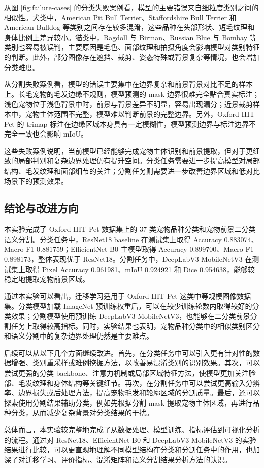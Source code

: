 \documentclass[UTF8,a4paper,12pt]{ctexart}
\begin{document}
从图 \ref{fig:failure-cases} 的分类失败案例看，模型的主要错误来自细粒度类别之间的相似性。犬类中，American Pit Bull Terrier、Staffordshire Bull Terrier 和 American Bulldog 等类别之间存在较多混淆，这些品种在头部形状、短毛纹理和身体比例上差异较小。猫类中，Ragdoll 与 Birman、Russian Blue 与 Bombay 等类别也容易被误判，主要原因是毛色、面部纹理和拍摄角度会影响模型对类别特征的判断。此外，部分图像存在遮挡、裁剪、姿态特殊或背景复杂等情况，也会增加分类难度。

从分割失败案例看，模型的错误主要集中在边界复杂和前景背景对比不足的样本上。长毛宠物的毛发边缘不规则，模型预测的 mask 边界很难完全贴合真实标注；浅色宠物位于浅色背景中时，前景与背景差异不明显，容易出现漏分；近景裁剪样本中，宠物主体范围不完整，模型难以判断前景的完整边界。另外，Oxford-IIIT Pet 的 trimap 标注在边缘区域本身具有一定模糊性，模型预测边界与标注边界不完全一致也会影响 mIoU。

这些失败案例说明，当前模型已经能够完成宠物主体识别和前景提取，但对于更细致的局部判别和复杂边界处理仍有提升空间。分类任务需要进一步提高模型对局部结构、毛发纹理和面部细节的关注；分割任务则需要进一步改善边界区域和低对比场景下的预测效果。

\subsection{结论与改进方向}

本实验完成了 Oxford-IIIT Pet 数据集上的 37 类宠物品种分类和宠物前景二分类语义分割。分类任务中，ResNet18 baseline 在测试集上取得 Accuracy 0.883074、Macro-F1 0.881759；EfficientNet-B0 主模型取得 Accuracy 0.899700、Macro-F1 0.898173，整体表现优于 ResNet18。分割任务中，DeepLabV3-MobileNetV3 在测试集上取得 Pixel Accuracy 0.961981、mIoU 0.924921 和 Dice 0.954638，能够较稳定地提取宠物前景区域。

通过本实验可以看出，迁移学习适用于 Oxford-IIIT Pet 这类中等规模图像数据集。分类模型加载 ImageNet 预训练权重后，可以在较少训练轮数内取得较好的分类效果；分割模型使用预训练 DeepLabV3-MobileNetV3，也能够在二分类前景分割任务上取得较高指标。同时，实验结果也表明，宠物品种分类中的相似类别区分和语义分割中的复杂边界处理仍然是主要难点。

后续可以从以下几个方面继续改进。首先，在分类任务中可以引入更有针对性的数据增强、类别重采样或难例挖掘方法，以改善易混淆类别的识别效果。其次，可以尝试更强的分类 backbone、注意力机制或局部区域特征方法，使模型更加关注脸部、毛发纹理和身体结构等关键细节。再次，在分割任务中可以尝试更高输入分辨率、边界损失或后处理方法，提高宠物毛发和轮廓区域的分割质量。最后，还可以探索使用分割结果辅助分类，例如先根据分割 mask 提取宠物主体区域，再进行品种分类，从而减少复杂背景对分类结果的干扰。

总体而言，本实验较完整地完成了从数据处理、模型训练、指标评估到可视化分析的流程。通过对 ResNet18、EfficientNet-B0 和 DeepLabV3-MobileNetV3 的实验结果进行比较，可以更直观地理解不同模型结构在分类和分割任务中的作用，也加深了对迁移学习、评价指标、混淆矩阵和语义分割结果分析方法的认识。
\end{document}
